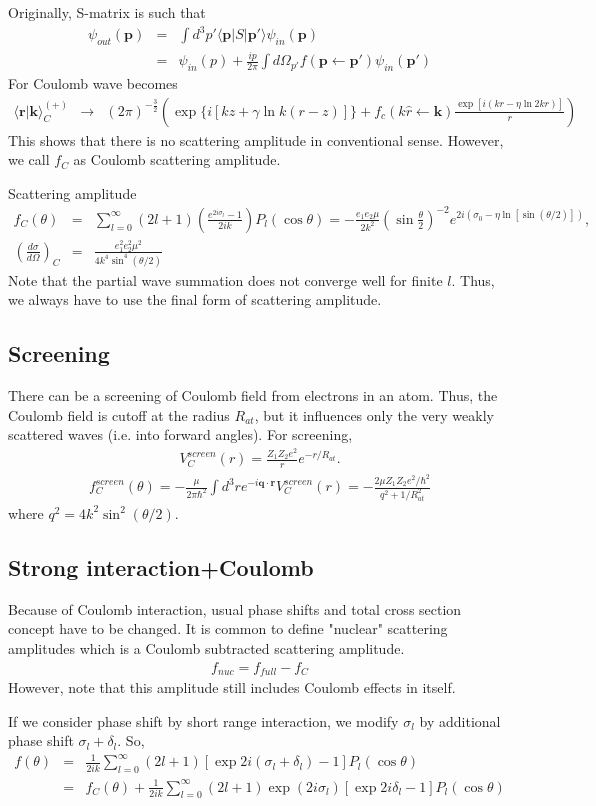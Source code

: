 \documentclass[10pt]{book}
\def\bm{\boldsymbol}
\newcommand{\bea}{\begin{eqnarray}}
\newcommand{\eea}{\end{eqnarray}}
\newcommand{\no}{\nonumber \\}
\def\vp{{\bm p}}
\def\vq{{\bm q}}
\def\vk{{\bm k}}
\def\vr{{\bm r}}
\def\la{\langle}
\def\ra{\rangle}
\begin{document}
Originally, S-matrix is such that
\bea
\psi_{out}(\vp)&=&\int d^3 p'\la \vp|S|\vp'\ra \psi_{in}(\vp)\no
               &=&\psi_{in}(p)+\frac{ip}{2\pi}\int d\Omega_{p'}
                  f(\vp\leftarrow \vp') \psi_{in}(\vp') 
\eea
For Coulomb wave becomes
\bea
\la \vr|\vk\ra^{(+)}_C
&\to& (2\pi)^{-\frac{3}{2}}
    \left( \exp\{ i[k z+\gamma \ln k(r-z)]\}
         +f_c(k\hat{r}\leftarrow\vk)
          \frac{\exp[i(kr-\eta\ln 2k r)]}{r}\right)
\eea
This shows that there is no scattering amplitude in conventional sense.
However, we call $f_C$ as Coulomb scattering amplitude.

Scattering amplitude
\bea
f_C(\theta)&=&\sum_{l=0}^{\infty} (2l+1)\left(\frac{e^{2i\sigma_l}-1}{2ik}\right)P_l(\cos\theta)
 =-\frac{e_1 e_2 \mu}{2 k^2}\left(\sin\frac{\theta}{2}\right)^{-2}
  e^{2i(\sigma_0-\eta\ln[\sin(\theta/2)])},\no
\left(\frac{d\sigma}{d\Omega}\right)_C
&=&\frac{ e_1^2 e_2^2 \mu^2}{4 k^4\sin^4(\theta/2)}
\eea
Note that the partial wave summation does not converge well for finite $l$.
Thus, we always have to use the final form of scattering amplitude.

\subsection{Screening}
There can be a screening of Coulomb field from electrons in an atom. 
Thus, the Coulomb field is cutoff at the radius $R_{at}$, but 
it influences only the very weakly scattered waves (i.e. into forward angles).
For screening,
\bea 
V^{screen}_C(r)=\frac{Z_1 Z_2 e^2}{r} e^{-r/R_{at}}.
\eea 
\bea 
f_C^{screen}(\theta)= - \frac{\mu}{2\pi\hbar^2}\int d^3 r e^{-i\vq\cdot\vr} V_C^{screen}(r)
    = -\frac{2\mu Z_1 Z_2 e^2/\hbar^2}{q^2+1/R_{at}^2}
\eea 
where $q^2=4k^2\sin^2(\theta/2)$.


\subsection{Strong interaction+Coulomb}
Because of Coulomb interaction, usual phase shifts
and total cross section concept have to be changed.
It is common to define "nuclear" scattering amplitudes
which is a Coulomb subtracted scattering amplitude.
\bea
f_{nuc}=f_{full}-f_C
\eea
However, note that this amplitude still includes Coulomb 
effects in itself. 

If we consider phase shift by short range interaction,
we modify $\sigma_l$ by additional phase shift
$\sigma_l+\delta_l$. So,
\bea
f(\theta)&=&\frac{1}{2ik}\sum_{l=0}^\infty (2l+1)
          [\exp 2i(\sigma_l+\delta_l)-1] P_l(\cos\theta)\no
         &=&f_C(\theta)
          +\frac{1}{2ik}\sum_{l=0}^\infty (2l+1)
                    \exp(2i\sigma_l)
                    [\exp 2i\delta_l-1] P_l(\cos\theta)
\eea
\end{document}
